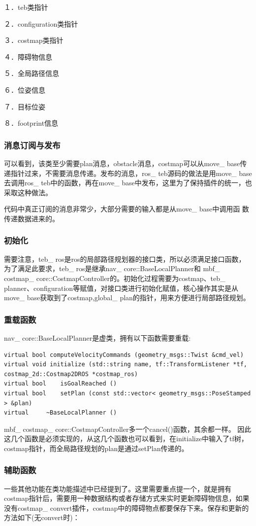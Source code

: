 \documentclass[10pt,a4paper]{article}
\theoremstyle{mythm}
\numberwithin{equation}{section}
\begin{document}
１．teb类指针

２．configuration类指针

３．costmap类指针

４．障碍物信息

５．全局路径信息

６．位姿信息

７．目标位姿

８．footprint信息
\subsubsection{消息订阅与发布}
可以看到，该类至少需要plan消息，obstacle消息，costmap可以从move\_ base传递指针过来，不需要消息传递。发布的消息，ros\_ teb源码的做法是用move\_ base去调用ros\_ teb中的函数，再在move\_ base中发布，这里为了保持插件的统一，也采取这种做法。

代码中真正订阅的消息非常少，大部分需要的输入都是从move\_ base中调用函
数传递数据进来的。
\subsubsection{初始化}
需要注意，teb\_ ros是ros的局部路径规划器的接口类，所以必须满足接口函数，为了满足此要求，teb\_ ros是继承nav\_ core::BaseLocalPlanner和 mbf\_ costmap\_ core::CostmapController的。初始化过程需要为costmap、teb\_ planner、configuration等赋值，对接口类进行初始化赋值，核心操作其实是从move\_ base获取到了costmap,global\_ plan的指针，用来方便进行局部路径规划。
\subsubsection{重载函数}
nav\_ core::BaseLocalPlanner是虚类，拥有以下函数需要重载:
\begin{lstlisting}[caption={BaseLocalPlanner}]
virtual bool computeVelocityCommands (geometry_msgs::Twist &cmd_vel)
virtual void initialize (std::string name, tf::TransformListener *tf, costmap_2d::Costmap2DROS *costmap_ros)
virtual bool 	isGoalReached ()
virtual bool 	setPlan (const std::vector< geometry_msgs::PoseStamped > &plan)
virtual 	~BaseLocalPlanner ()
\end{lstlisting}
mbf\_ costmap\_ core::CostmapController多一个cancel()函数，其余都一样。
因此这几个函数是必须实现的，从这几个函数也可以看到，在initialize中输入了tf树，costmap指针，而全局路径规划的plan是通过setPlan传递的。
\subsubsection{辅助函数}
一些其他功能在类功能描述中已经提到了。这里需要重点提一个，就是拥有costmap指针后，需要用一种数据结构或者存储方式来实时更新障碍物信息，如果没有costmap\_ convert插件，costmap中的障碍物点都要保存下来。保存和更新的方法如下(无convert时)：
\end{document}
